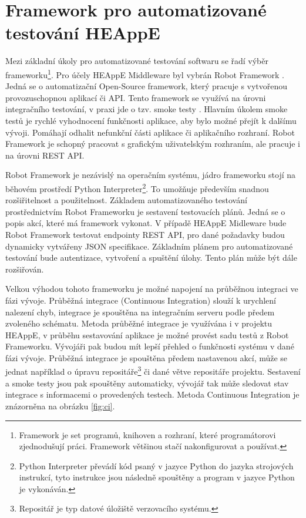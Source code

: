 \section{Framework pro automatizované testování HEAppE}
Mezi základní úkoly pro automatizované testování softwaru se řadí výběr frameworku\footnote{Framework je set programů, knihoven a rozhraní, které programátorovi zjednodušují práci. Framework většinou stačí nakonfigurovat a používat.}. Pro účely HEAppE Middleware byl vybrán Robot Framework \cite{UDdvJfGpGdOGQs2a}. Jedná se o automatizační Open-Source framework, který pracuje s vytvořenou provozuschopnou aplikací či API. Tento framework se využívá na úrovni integračního testování, v praxi jde o tzv. smoke testy \cite{K35ZsSqAfq3Ec1XJ}. Hlavním úkolem smoke testů je rychlé vyhodnocení funkčnosti aplikace, aby bylo možné přejít k dalšímu vývoji. Pomáhají odhalit nefunkční části aplikace či aplikačního rozhraní. Robot Framework je schopný pracovat s grafickým uživatelským rozhraním, ale pracuje i na úrovni REST API.

Robot Framework je nezávislý na operačním systému, jádro frameworku stojí na běhovém prostředí Python Interpreter\footnote{Python Interpreter převádí kód psaný v jazyce Python do jazyka strojových instrukcí, tyto instrukce jsou následně spouštěny a program v jazyce Python je vykonáván.}. To umožňuje především snadnou rozšiřitelnost a použitelnost. Základem automatizovaného testování prostřednictvím Robot Frameworku je sestavení testovacích plánů. Jedná se o popis akcí, které má framework vykonat. V případě HEAppE Midleware bude Robot Framework testovat endpointy REST API, pro dané požadavky budou dynamicky vytvářeny JSON specifikace. Základním plánem pro automatizované testování bude autentizace, vytvoření a spuštění úlohy. Tento plán může být dále rozšiřován.

Velkou výhodou tohoto frameworku je možné napojení na průběžnou integraci ve fázi vývoje. Průběžná integrace (Continuous Integration) slouží k urychlení nalezení chyb, integrace je spouštěna na integračním serveru podle předem zvoleného schématu. Metoda průběžné integrace je využívána i v projektu HEAppE, v průběhu sestavování aplikace je možné provést sadu testů z Robot Frameworku. Vývojáři pak budou mít lepší přehled o funkčnosti systému v dané fázi vývoje. Průběžná integrace je spouštěna předem nastavenou akcí, může se jednat například o úpravu repositáře\footnote{Repositář je typ datové úložiště verzovacího systému.} či dané větve repositáře projektu. Sestavení a smoke testy jsou pak spouštěny automaticky, vývojář tak může sledovat stav integrace s informacemi o provedených testech. Metoda Continuous Integration je znázorněna na obrázku \ref{fig:ci}.

